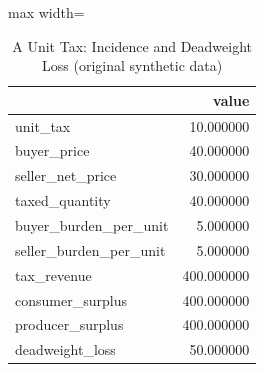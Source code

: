 \begin{table}[htbp]
\centering
\caption{A Unit Tax: Incidence and Deadweight Loss (original synthetic data)}
\begingroup
\small
\setlength{\tabcolsep}{6pt}
\renewcommand{\arraystretch}{1.12}
\begin{adjustbox}{max width=\linewidth}
\begin{tabular}{@{}lr@{}}
\toprule
 & value \\
\midrule
unit\_tax & 10.000000 \\
buyer\_price & 40.000000 \\
seller\_net\_price & 30.000000 \\
taxed\_quantity & 40.000000 \\
buyer\_burden\_per\_unit & 5.000000 \\
seller\_burden\_per\_unit & 5.000000 \\
tax\_revenue & 400.000000 \\
consumer\_surplus & 400.000000 \\
producer\_surplus & 400.000000 \\
deadweight\_loss & 50.000000 \\
\bottomrule
\end{tabular}
\end{adjustbox}
\endgroup
\end{table}